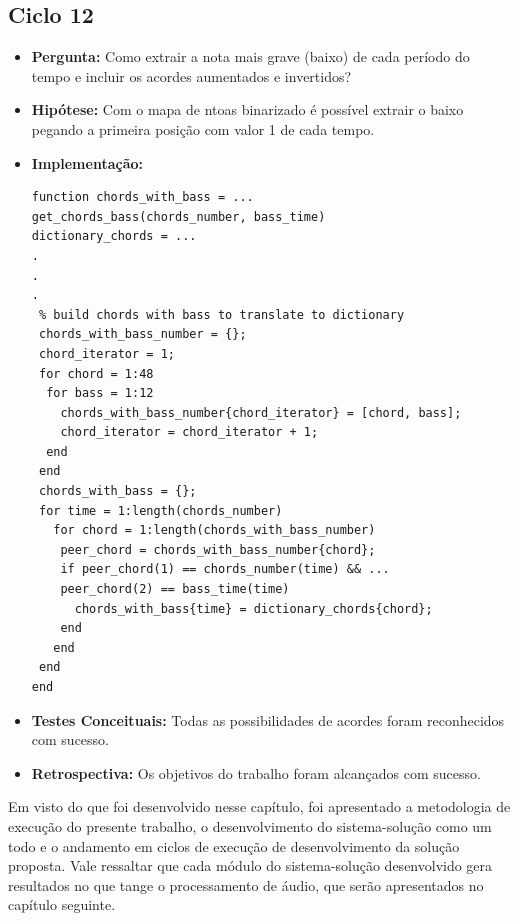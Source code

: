 \subsection{Ciclo 12}
\label{subsec:ciclo_12}
\begin{itemize}
\item \textbf{Pergunta:} Como extrair a nota mais grave (baixo) de cada período do tempo e incluir os acordes aumentados e invertidos?
\item \textbf{Hipótese:} Com o mapa de ntoas binarizado é possível extrair o baixo pegando a primeira posição com valor 1 de cada tempo.
\item \textbf{Implementação:}
\begin{lstlisting}
function chords_with_bass = ...
get_chords_bass(chords_number, bass_time)
dictionary_chords = ...
.
.
.
 % build chords with bass to translate to dictionary
 chords_with_bass_number = {};
 chord_iterator = 1;
 for chord = 1:48
  for bass = 1:12
    chords_with_bass_number{chord_iterator} = [chord, bass];
    chord_iterator = chord_iterator + 1;
  end
 end
 chords_with_bass = {};
 for time = 1:length(chords_number)
   for chord = 1:length(chords_with_bass_number)
    peer_chord = chords_with_bass_number{chord};
    if peer_chord(1) == chords_number(time) && ...
    peer_chord(2) == bass_time(time)
      chords_with_bass{time} = dictionary_chords{chord};
    end
   end
 end
end
\end{lstlisting}
\item \textbf{Testes Conceituais:} Todas as possibilidades de acordes foram reconhecidos com sucesso.
\item \textbf{Retrospectiva:} Os objetivos do trabalho foram alcançados com sucesso.
\end{itemize}

Em visto do que foi desenvolvido nesse capítulo, foi apresentado a metodologia de execução do presente trabalho, o desenvolvimento do sistema-solução como um todo e o andamento em ciclos de execução de desenvolvimento da solução proposta. Vale ressaltar que cada módulo do sistema-solução desenvolvido gera resultados no que tange o processamento de áudio, que serão apresentados no capítulo seguinte. 